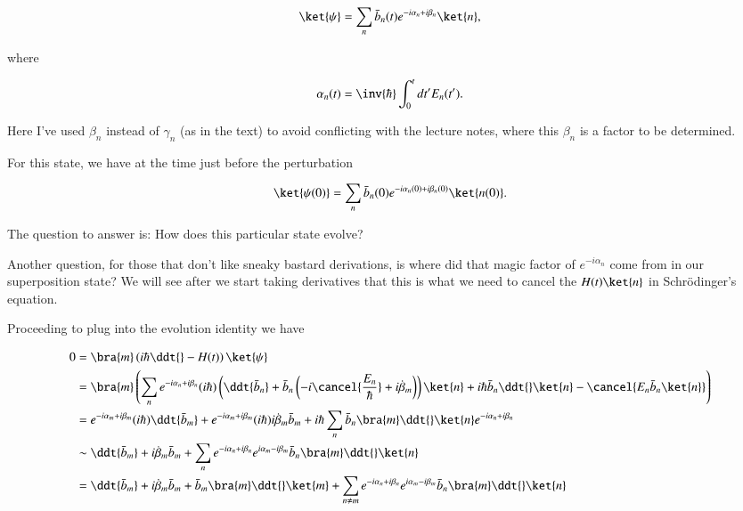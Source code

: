 \begin{equation}\label{eqn:adiabaticPertTakeII:70}
\ket{\psi} = \sum_n \bar{b}_n(t) e^{-i\alpha_n + i \beta_n} \ket{n},
\end{equation}

where

\begin{equation}\label{eqn:adiabaticPertTakeII:90}
\alpha_n(t) = \inv{\hbar} \int_0^t dt' E_n(t').
\end{equation}

Here I've used $\beta_n$ instead of $\gamma_n$ (as in the text) to avoid conflicting with the lecture notes, where this $\beta_n$ is a factor to be determined.


For this state, we have at the time just before the perturbation

\begin{equation}\label{eqn:adiabaticPertTakeII:110}
\ket{\psi(0)} = \sum_n \bar{b}_n(0) e^{-i\alpha_n(0) + i \beta_n(0)} \ket{n(0)}.
\end{equation}

The question to answer is: How does this particular state evolve?

Another question, for those that don't like sneaky bastard derivations, is where did that magic factor of $e^{-i\alpha_n}$ come from in our superposition state? We will see after we start taking derivatives that this is what we need to cancel the $H(t)\ket{n}$ in Schr\"{o}dinger's equation.

Proceeding to plug into the evolution identity we have

\begin{align*}
0 &=
\bra{m} \left( i \hbar \ddt{} - H(t) \right) \ket{\psi} \\
&=
\bra{m} \left(
\sum_n 
e^{-i \alpha_n + i \beta_n}
(i \hbar) \left(
\ddt{\bar{b}_n}
+ \bar{b}_n \left(-i \cancel{\frac{E_n}{\hbar}} + i \dot{\beta}_m \right)
\right) \ket{n}
+ i \hbar \bar{b}_n \ddt{} \ket{n}
- \cancel{E_n \bar{b}_n \ket{n}} 
\right)
\\
&=
e^{-i \alpha_m + i \beta_m}
(i \hbar) 
\ddt{\bar{b}_m}
+
e^{-i \alpha_m + i \beta_m}
(i \hbar) 
i \dot{\beta}_m \bar{b}_m
+ i \hbar \sum_n \bar{b}_n \bra{m} \ddt{} \ket{n}
e^{-i \alpha_n + i \beta_n} \\
&\sim
\ddt{\bar{b}_m}
+
i \dot{\beta}_m \bar{b}_m
+ 
\sum_n 
e^{-i \alpha_n + i \beta_n}
e^{i \alpha_m - i \beta_m}
\bar{b}_n \bra{m} \ddt{} \ket{n} \\
&=
\ddt{\bar{b}_m}
+
i \dot{\beta}_m \bar{b}_m
+ 
\bar{b}_m \bra{m} \ddt{} \ket{m}
+
\sum_{n \ne m} 
e^{-i \alpha_n + i \beta_n}
e^{i \alpha_m - i \beta_m}
\bar{b}_n \bra{m} \ddt{} \ket{n}
\end{align*}

